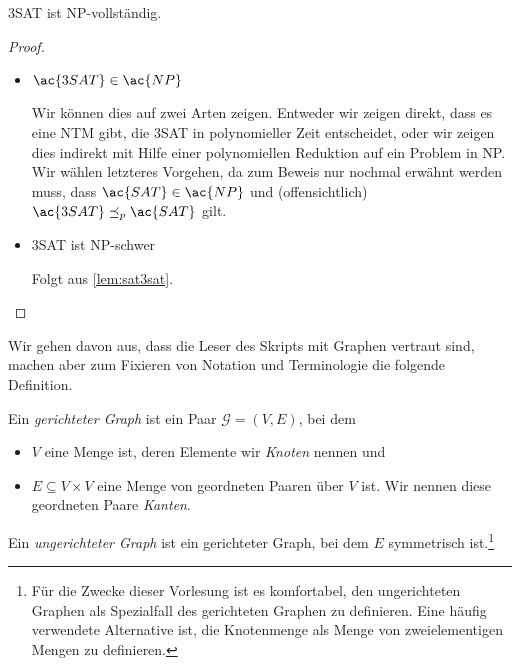 \begin{Satz}[name={[3SAT ist \ac{NP}-vollständig]}]
	\ac{3SAT} ist \ac{NP}-vollständig.
\end{Satz}
\begin{proof}
 \
 \begin{itemize}
  \item $\ac{3SAT} \in \ac{NP}$
  
  Wir können dies auf zwei Arten zeigen. 
  Entweder wir zeigen direkt, dass es eine \ac{NTM} gibt, die \ac{3SAT} in polynomieller Zeit entscheidet, oder
  wir zeigen dies indirekt mit Hilfe einer polynomiellen Reduktion auf ein Problem in \ac{NP}.
  Wir wählen letzteres Vorgehen, da zum Beweis nur nochmal erwähnt werden muss, dass $\ac{SAT} \in \ac{NP}$ und (offensichtlich) $\ac{3SAT} \preceq_p \ac{SAT}$ gilt.
  
  \item \ac{3SAT} ist \ac{NP}-schwer
  
  Folgt aus \autoref{lem:sat3sat}.\qedhere
 \end{itemize}
\end{proof}


Wir gehen davon aus, dass die Leser des Skripts mit Graphen vertraut sind, machen aber zum Fixieren von Notation und Terminologie die folgende Definition.
\begin{Def}
 Ein \emph{gerichteter Graph} ist ein Paar $\mathcal{G}=(V,E)$, bei dem
 \begin{itemize}
  \item $V$ eine Menge ist, deren Elemente wir \emph{Knoten} nennen und
  \item $E\subseteq V\times V$ eine Menge von geordneten Paaren über $V$ ist. 
  Wir nennen diese geordneten Paare \emph{Kanten}.
 \end{itemize}
 Ein \emph{ungerichteter Graph} ist ein gerichteter Graph, bei dem $E$ symmetrisch ist.\footnote{%
 Für die Zwecke dieser Vorlesung ist es komfortabel, den ungerichteten Graphen als Spezialfall des gerichteten Graphen zu definieren.
 Eine häufig verwendete Alternative ist, die Knotenmenge als Menge von zweielementigen Mengen zu definieren.}
\end{Def}



